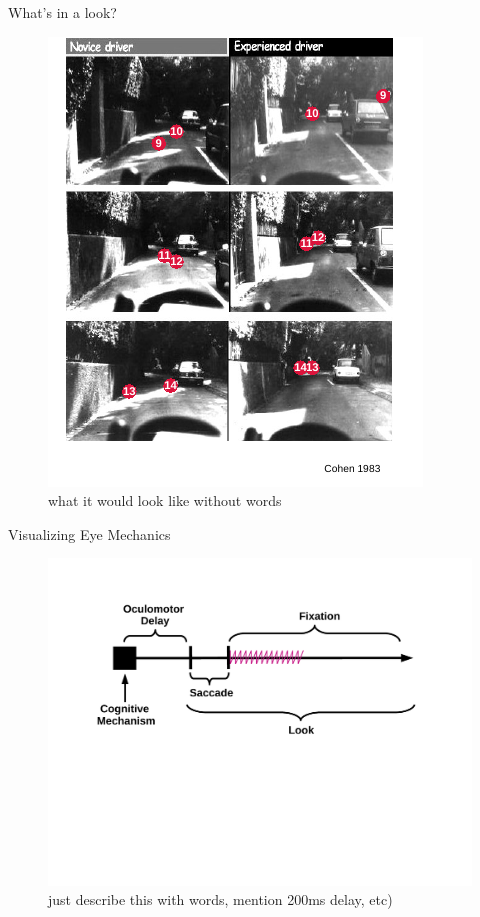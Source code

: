 \documentclass{beamer}
\begin{document}
\begin{frame}{What's in a look?}
\vspace{-1mm}
\begin{figure}
\centering
\includegraphics[scale=0.95]{img/edit_car_eye.pdf}
\caption{ what it would look like without words}
\end{figure}
\end{frame}



\begin{frame}{Visualizing Eye Mechanics}
\vspace{-1mm}
\begin{figure}
\centering
\includegraphics[scale=0.45]{img/what_is_a_look.pdf}
\caption{just describe this with words, mention 200ms delay, etc)}
\end{figure}
\end{frame}
\end{document}
